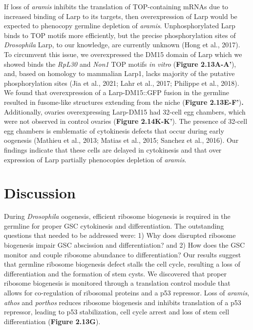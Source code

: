 \documentclass[12pt,oneside]{reedthesis}
\begin{document}
If loss of \emph{aramis} inhibits the translation of TOP-containing mRNAs due
to increased binding of Larp to its targets, then overexpression of Larp
would be expected to phenocopy germline depletion of \emph{aramis}.
Unphosphorylated Larp binds to TOP motifs more efficiently, but the
precise phosphorylation sites of \emph{Drosophila} Larp, to our knowledge,
are currently unknown (Hong et al., 2017). To circumvent this issue, we
overexpressed the DM15 domain of Larp which we showed binds the \emph{RpL30}
and \emph{Non1} TOP motifs \emph{in vitro} (\textbf{Figure 2.13A-A'}), and, based on
homology to mammalian Larp1, lacks majority of the putative
phosphorylation sites (Jia et al., 2021; Lahr et al., 2017; Philippe et al., 2018). We found that overexpression of a
Larp-DM15::GFP fusion in the germline resulted in fusome-like structures
extending from the niche (\textbf{Figure 2.13E-F'})\textbf{.} Additionally, ovaries
overexpressing Larp-DM15 had 32-cell egg chambers, which were not
observed in control ovaries (\textbf{Figure 2.14K-K'}). The presence of 32-cell
egg chambers is emblematic of cytokinesis defects that occur during
early oogenesis (Mathieu et al., 2013; Matias et al., 2015; Sanchez et al., 2016). Our
findings indicate that these cells are delayed in cytokinesis and that
over expression of Larp partially phenocopies depletion of \emph{aramis}.

\hypertarget{discussion}{%
\section{Discussion}\label{discussion}}

During \emph{Drosophila} oogenesis, efficient ribosome biogenesis is required
in the germline for proper GSC cytokinesis and differentiation. The
outstanding questions that needed to be addressed were: 1) Why does
disrupted ribosome biogenesis impair GSC abscission and differentiation?
and 2) How does the GSC monitor and couple ribosome abundance to
differentiation? Our results suggest that germline ribosome biogenesis
defect stalls the cell cycle, resulting a loss of differentiation and
the formation of stem cysts. We discovered that proper ribosome
biogenesis is monitored through a translation control module that allows
for co-regulation of ribosomal proteins and a p53 repressor. Loss of
\emph{aramis}, \emph{athos} and \emph{porthos} reduces ribosome biogenesis and inhibits
translation of a p53 repressor, leading to p53 stabilization, cell cycle
arrest and loss of stem cell differentiation (\textbf{Figure 2.13G}).
\end{document}
